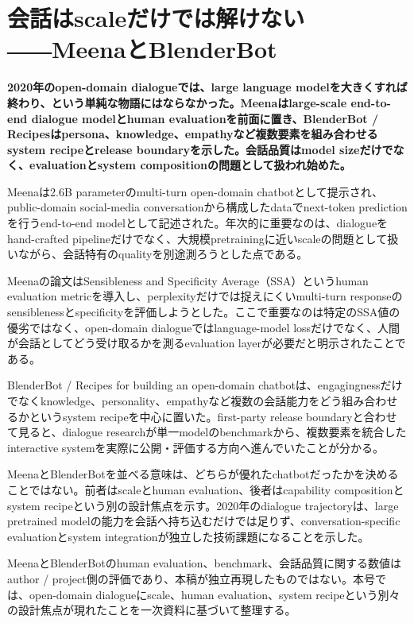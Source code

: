 \section{会話はscaleだけでは解けない――MeenaとBlenderBot}
\noindent\textbf{2020年のopen-domain dialogueでは、large language modelを大きくすれば終わり、という単純な物語にはならなかった。Meenaはlarge-scale end-to-end dialogue modelとhuman evaluationを前面に置き、BlenderBot / Recipesはpersona、knowledge、empathyなど複数要素を組み合わせるsystem recipeとrelease boundaryを示した。会話品質はmodel sizeだけでなく、evaluationとsystem compositionの問題として扱われ始めた。}\autocite{src-66cb10bf43ff,src-8260c320e205,src-8930f1933983}

Meenaは2.6B parameterのmulti-turn open-domain chatbotとして提示され、public-domain social-media conversationから構成したdataでnext-token predictionを行うend-to-end modelとして記述された。年次的に重要なのは、dialogueをhand-crafted pipelineだけでなく、大規模pretrainingに近いscaleの問題として扱いながら、会話特有のqualityを別途測ろうとした点である。\autocite{src-8930f1933983}


Meenaの論文はSensibleness and Specificity Average（SSA）というhuman evaluation metricを導入し、perplexityだけでは捉えにくいmulti-turn responseのsensiblenessとspecificityを評価しようとした。ここで重要なのは特定のSSA値の優劣ではなく、open-domain dialogueではlanguage-model lossだけでなく、人間が会話としてどう受け取るかを測るevaluation layerが必要だと明示されたことである。\autocite{src-8930f1933983}


BlenderBot / Recipes for building an open-domain chatbotは、engagingnessだけでなくknowledge、personality、empathyなど複数の会話能力をどう組み合わせるかというsystem recipeを中心に置いた。first-party release boundaryと合わせて見ると、dialogue researchが単一modelのbenchmarkから、複数要素を統合したinteractive systemを実際に公開・評価する方向へ進んでいたことが分かる。\autocite{src-66cb10bf43ff,src-8260c320e205}


MeenaとBlenderBotを並べる意味は、どちらが優れたchatbotだったかを決めることではない。前者はscaleとhuman evaluation、後者はcapability compositionとsystem recipeという別の設計焦点を示す。2020年のdialogue trajectoryは、large pretrained modelの能力を会話へ持ち込むだけでは足りず、conversation-specific evaluationとsystem integrationが独立した技術課題になることを示した。\autocite{src-66cb10bf43ff,src-8260c320e205,src-8930f1933983}


\begin{claimboundary}
MeenaとBlenderBotのhuman evaluation、benchmark、会話品質に関する数値はauthor / project側の評価であり、本稿が独立再現したものではない。本号では、open-domain dialogueにscale、human evaluation、system recipeという別々の設計焦点が現れたことを一次資料に基づいて整理する。\autocite{src-66cb10bf43ff,src-8260c320e205,src-8930f1933983}
\end{claimboundary}
